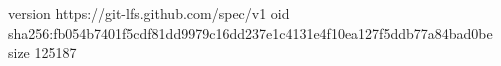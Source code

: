 version https://git-lfs.github.com/spec/v1
oid sha256:fb054b7401f5cdf81dd9979c16dd237e1c4131e4f10ea127f5ddb77a84bad0be
size 125187
